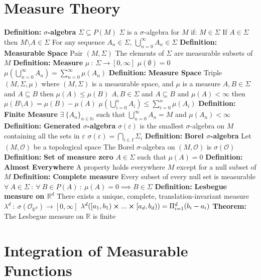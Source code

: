 \documentclass[14pt]{extarticle}
\def\Definition{{\color{blue} \textbf{Definition:} }}
\def\Theorem{{\color{red} \textbf{Theorem:} }}
\begin{document}
\begin{outline}
	\section*{Measure Theory}
		\1	\Definition \textbf{$\sigma$-algebra}
			\2	$\Sigma \subseteq P(M)$
			\2	$\Sigma$ is a $\sigma$-algebra for $M$ if:
				\3	$M \in \Sigma$
				\3	If $A \in \Sigma$ then $M \setminus A \in \Sigma$
				\3	For any sequence $A_n \in \Sigma$, $\bigcup_{n=0}^{\infty}A_n \in \Sigma$
		\1	\Definition \textbf{Measurable Space}
			\2	Pair $(M,\Sigma)$ 
			\2	The elements of $\Sigma$ are measurable subsets of $M$
		\1	\Definition \textbf{Measure}
			\2	$\mu~:~\Sigma \rightarrow [0,\infty]$
			\2	$\mu(\emptyset) = 0$
			\2	$\mu(\bigcup_{n=0}^{\infty}A_n) = \sum_{n=0}^{\infty}\mu(A_n)$
		\1	\Definition \textbf{Measure Space}
			\2	Triple $(M,\Sigma,\mu)$ where $(M,\Sigma)$ is a measurable space, and
					$\mu$ is a measure
			\2	$A,B \in \Sigma$ and $A \subseteq B$ then $\mu(A) \le \mu(B)$
			\2	$A,B \in \Sigma$ and $A \subseteq B$ and $\mu(A) < \infty$ then
					$\mu(B \setminus A) = \mu(B) - \mu(A)$
			\2	$\mu(\bigcup_{i=0}^{n}A_i) \le \sum_{i=0}^{n}\mu(A_i)$
			\2	\Definition \textbf{Finite Measure}
				\3	$\exists~\{A_n\}_{n \in \mathbb{N}}$ such that
						$\bigcup_{n=0}^{\infty}A_n = M$ and $\mu(A_n) < \infty$
		\1	\Definition \textbf{Generated $\sigma$-algebra}
			\2	$\sigma(\varepsilon)$ is the smallest $\sigma$-algebra on $M$ containing
					all the sets in $\varepsilon$
			\2	$\sigma(\varepsilon) = \bigcap_{i \in I} \Sigma_i$
		\1	\Definition \textbf{Borel $\sigma$-algebra}
			\2	Let $(M,\mathcal{O})$ be a topological space
			\2	The Borel $\sigma$-algebra on $(M,\mathcal{O})$ is $\sigma(\mathcal{O})$
		\1	\Definition \textbf{Set of measure zero}
			\2	$A \in \Sigma$ such that $\mu(A) = 0$
		\1	\Definition \textbf{Almost Everywhere}
			\2	A property holds everywhere $M$ except for a null subset of $M$
		\1	\Definition \textbf{Complete measure}
			\2	Every subset of every null set is measurable
			\2	$\forall~A \in \Sigma~:~\forall~B \in P(A)~:~\mu(A) = 0 \implies B \in \Sigma$
		\1	\Definition \textbf{Lesbegue measure on $\mathbb{R}^d$}
			\2	There exists a unique, complete, translation-invariant measure 
					$\lambda^d~:~\sigma(\mathcal{O}_{\mathbb{R}^d}) \rightarrow [0,\infty]$
			\2	$\lambda^d([a_1,b_1) \cross ... \cross [a_d,b_d)) = \Pi_{i=1}^d(b_i - a_i)$
		\1	\Theorem The Lesbegue measure on $\mathbb{R}$ is finite
	
	\section*{Integration of Measurable Functions}
	\end{outline}
\end{document}
